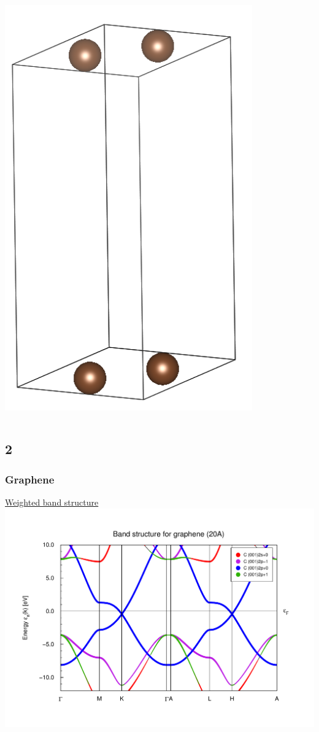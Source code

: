 \documentclass{beamer}
\begin{document}
\begin{frame}
\begin{columns}[T]
\begin{column}{.48\textwidth}
					\includegraphics[width=0.8\textwidth]{figures/graphene.png}
				\end{column}%
			\end{columns}
		\end{frame}

	\subsection*{2}
		\begin{frame}
			\frametitle{Graphene}
			\underline{Weighted band structure}
			\includegraphics[width=\textwidth]{figures/GrapheneNew/bweights.pdf}
		\end{frame}
\end{document}
